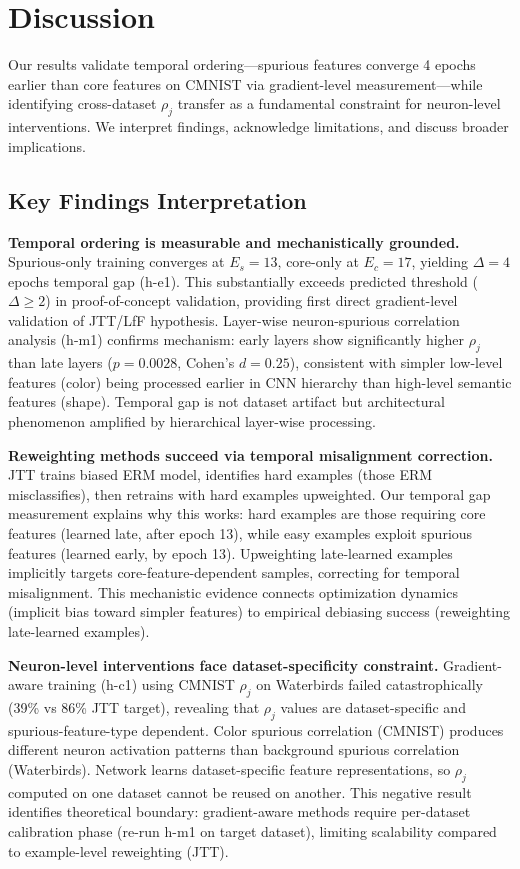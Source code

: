 \section{Discussion}

Our results validate temporal ordering---spurious features converge 4 epochs earlier than core features on CMNIST via gradient-level measurement---while identifying cross-dataset $\rho_j$ transfer as a fundamental constraint for neuron-level interventions. We interpret findings, acknowledge limitations, and discuss broader implications.

\subsection{Key Findings Interpretation}

\textbf{Temporal ordering is measurable and mechanistically grounded.} Spurious-only training converges at $E_s=13$, core-only at $E_c=17$, yielding $\Delta=4$ epochs temporal gap (h-e1). This substantially exceeds predicted threshold ($\Delta \geq 2$) in proof-of-concept validation, providing first direct gradient-level validation of JTT/LfF hypothesis. Layer-wise neuron-spurious correlation analysis (h-m1) confirms mechanism: early layers show significantly higher $\rho_j$ than late layers ($p=0.0028$, Cohen's $d=0.25$), consistent with simpler low-level features (color) being processed earlier in CNN hierarchy than high-level semantic features (shape). Temporal gap is not dataset artifact but architectural phenomenon amplified by hierarchical layer-wise processing.

\textbf{Reweighting methods succeed via temporal misalignment correction.} JTT trains biased ERM model, identifies hard examples (those ERM misclassifies), then retrains with hard examples upweighted. Our temporal gap measurement explains why this works: hard examples are those requiring core features (learned late, after epoch 13), while easy examples exploit spurious features (learned early, by epoch 13). Upweighting late-learned examples implicitly targets core-feature-dependent samples, correcting for temporal misalignment. This mechanistic evidence connects optimization dynamics (implicit bias toward simpler features) to empirical debiasing success (reweighting late-learned examples).

\textbf{Neuron-level interventions face dataset-specificity constraint.} Gradient-aware training (h-c1) using CMNIST $\rho_j$ on Waterbirds failed catastrophically (39\% vs 86\% JTT target), revealing that $\rho_j$ values are dataset-specific and spurious-feature-type dependent. Color spurious correlation (CMNIST) produces different neuron activation patterns than background spurious correlation (Waterbirds). Network learns dataset-specific feature representations, so $\rho_j$ computed on one dataset cannot be reused on another. This negative result identifies theoretical boundary: gradient-aware methods require per-dataset calibration phase (re-run h-m1 on target dataset), limiting scalability compared to example-level reweighting (JTT).

